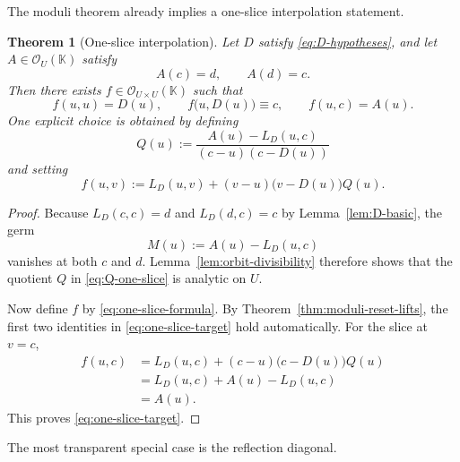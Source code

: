 \documentclass[11pt]{amsart}
\numberwithin{equation}{section}
\newtheorem{theorem}{Theorem}[section]
\theoremstyle{remark}
\theoremstyle{definition}
\newcommand{\K}{\mathbb{K}}
\newcommand{\Oc}{\mathcal{O}}
\begin{document}
The moduli theorem already implies a one-slice interpolation statement.

\begin{theorem}[One-slice interpolation]\label{thm:one-slice}
Let $D$ satisfy \eqref{eq:D-hypotheses}, and let $A\in \Oc_U(\K)$ satisfy
\[
A(c)=d,\qquad A(d)=c.
\]
Then there exists $f\in \Oc_{U\times U}(\K)$ such that
\begin{equation}\label{eq:one-slice-target}
f(u,u)=D(u),\qquad f\bigl(u,D(u)\bigr)\equiv c,\qquad f(u,c)=A(u).
\end{equation}
One explicit choice is obtained by defining
\begin{equation}\label{eq:Q-one-slice}
Q(u):=\frac{A(u)-L_D(u,c)}{(c-u)(c-D(u))}
\end{equation}
and setting
\begin{equation}\label{eq:one-slice-formula}
f(u,v):=L_D(u,v)+(v-u)\bigl(v-D(u)\bigr)Q(u).
\end{equation}
\end{theorem}

\begin{proof}
Because $L_D(c,c)=d$ and $L_D(d,c)=c$ by Lemma~\ref{lem:D-basic}, the germ
\[
M(u):=A(u)-L_D(u,c)
\]
vanishes at both $c$ and $d$. Lemma~\ref{lem:orbit-divisibility} therefore shows that the quotient $Q$ in \eqref{eq:Q-one-slice} is analytic on $U$.

Now define $f$ by \eqref{eq:one-slice-formula}. By Theorem~\ref{thm:moduli-reset-lifts}, the first two identities in \eqref{eq:one-slice-target} hold automatically. For the slice at $v=c$,
\begin{align*}
f(u,c)
&=L_D(u,c)+(c-u)\bigl(c-D(u)\bigr)Q(u) \\
&=L_D(u,c)+A(u)-L_D(u,c) \\
&=A(u).
\end{align*}
This proves \eqref{eq:one-slice-target}.
\end{proof}

The most transparent special case is the reflection diagonal.
\end{document}
